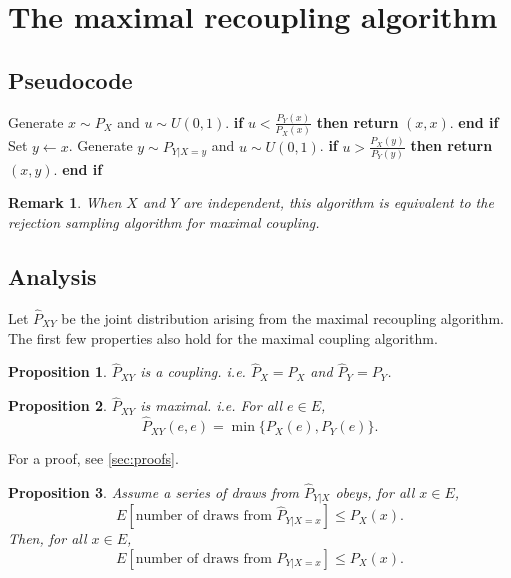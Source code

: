 \documentclass{article}
\newtheorem{proposition}{Proposition}
\newtheorem{remark}{Remark}
\newcommand{\mrc}{MRC\xspace}
\begin{document}
\section{The maximal recoupling algorithm}

\subsection{Pseudocode}

\begin{algorithm}[h]
\caption{Maximal recoupling (\mrc)}
\label{alg:maximal_recoupling}
\begin{algorithmic}[1]
\STATE Generate \(x \sim P_X\) and \(u \sim U(0,1)\).
\STATE \textbf{if} \(u < \frac{P_Y(x)}{P_X(x)}\) \textbf{then return} \((x, x)\). \textbf{end if}
\STATE Set \(y \gets x\).
\LOOP
\STATE Generate \(y \sim P_{Y|X=y}\) and \(u \sim U(0,1)\).
\STATE \textbf{if} \(u > \frac{P_X(y)}{P_Y(y)}\) \textbf{then return} \((x, y)\). \textbf{end if}
\ENDLOOP
\end{algorithmic}
\end{algorithm}

\begin{remark}
    When $X$ and $Y$ are independent, this algorithm is equivalent to the rejection sampling
    algorithm for maximal coupling.
\end{remark}

\subsection{Analysis}

Let \(\hat{P}_{XY}\) be the joint distribution arising from the maximal recoupling algorithm.
The first few properties also hold for the maximal coupling algorithm.

\begin{proposition}
    \(\hat{P}_{XY}\) is a coupling. i.e. $\hat{P}_X = P_X$ and $\hat{P}_Y = P_Y$.
\end{proposition}

\begin{proposition}
    \(\hat{P}_{XY}\) is maximal. i.e. For all \(e \in E\),
    \[
        \hat{P}_{XY}(e,e) = \min \{ P_X(e), P_Y(e) \}.
    \]
\end{proposition}

For a proof, see \cref{sec:proofs}.

\begin{proposition}
    Assume a series of draws from $\hat{P}_{Y|X}$ obeys,
    for all $x \in E$,
    \[
        E[\text{number of draws from \(\hat{P}_{Y|X=x}\)}] \le P_X(x).
    \]
    Then, for all $x \in E$,
    \[
        E[\text{number of draws from \(P_{Y|X=x}\)}] \le P_X(x).
    \]
\end{proposition}
\end{document}
